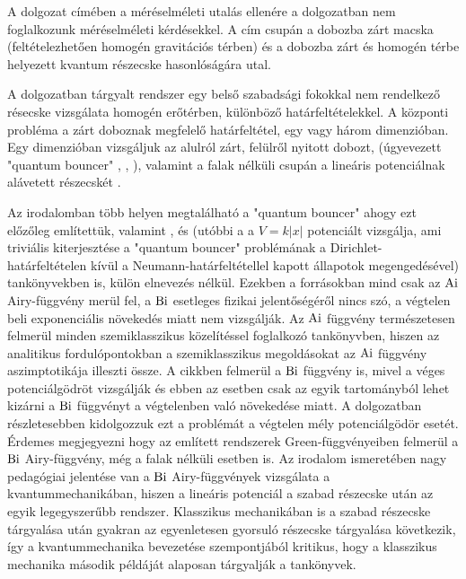 A dolgozat címében a méréselméleti utalás ellenére a dolgozatban nem foglalkozunk méréselméleti kérdésekkel. A cím csupán a dobozba zárt macska (feltételezhetően homogén gravitációs térben) és a dobozba zárt és homogén térbe helyezett kvantum részecske hasonlóságára utal.

A dolgozatban tárgyalt rendszer egy belső szabadsági fokokkal nem rendelkező résecske vizsgálata homogén erőtérben, különböző határfeltételekkel. A központi probléma a zárt doboznak megfelelő határfeltétel, egy vagy három dimenzióban. Egy dimenzióban vizsgáljuk az alulról zárt, felülről nyitott dobozt, (úgyevezett "quantum bouncer" \cite{vankov2009quantum}, \cite{doi:10.1119/1.10024}, \cite{doi:10.1119/1.16673}), valamint a falak nélküli csupán a lineáris potenciálnak alávetett részecskét \cite[137-138.o.]{Vallee:2010:AFA}.

Az irodalomban több helyen megtalálható a "quantum bouncer" ahogy ezt előzőleg említettük, valamint \cite{Landau1981Quantum}, \cite{Griffiths2004Introduction} és \cite{Sakurai:1167961} (utóbbi a a $V=k\lvert x \rvert$ potenciált vizsgálja, ami triviális kiterjesztése a "quantum bouncer" problémának a Dirichlet-határfeltételen kívül a Neumann-határfeltétellel kapott állapotok megengedésével) tankönyvekben is, külön elnevezés nélkül. Ezekben a forrásokban mind csak az $\mathrm{Ai}$ Airy-függvény merül fel, a $\mathrm{Bi}$ esetleges fizikai jelentőségéről nincs szó, a végtelen beli exponenciális növekedés miatt nem vizsgálják. Az $\mathrm{Ai}$ függvény természetesen felmerül minden szemiklasszikus közelítéssel foglalkozó tankönyvben, hiszen az analitikus fordulópontokban a szemiklasszikus megoldásokat az $\mathrm{Ai}$ függvény aszimptotikája illeszti össze. A \cite{doi:10.1007/s12043-001-0081-1} cikkben felmerül a $\mathrm{Bi}$ függvény is, mivel a véges potenciálgödröt vizsgálják és ebben az esetben csak az egyik tartományból lehet kizárni a $\mathrm{Bi}$ függvényt a végtelenben való növekedése miatt. A dolgozatban részletesebben kidolgozzuk ezt a problémát a végtelen mély potenciálgödör esetét. Érdemes megjegyezni hogy az említett rendszerek Green-függvényeiben felmerül a $\mathrm{Bi}$ Airy-függvény, még a falak nélküli esetben is. Az irodalom ismeretében nagy pedagógiai jelentése van a $\mathrm{Bi}$ Airy-függvények vizsgálata a kvantummechanikában, hiszen a lineáris potenciál a szabad részecske után az egyik legegyszerűbb rendszer. Klasszikus mechanikában is a szabad részecske tárgyalása után gyakran az egyenletesen gyorsuló részecske tárgyalása következik, így a kvantummechanika bevezetése szempontjából kritikus, hogy a klasszikus mechanika második példáját alaposan tárgyalják a tankönyvek.

